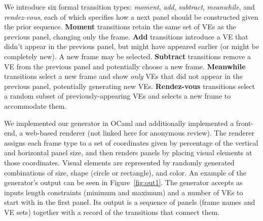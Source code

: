 
We introduce six formal transition types: {\em moment}, {\em add}, {\em
subtract}, {\em meanwhile}, and {\em rendez-vous}, each of which specifies
how a next panel should be constructed given the prior sequence.
{\bf Moment} transitions retain the same set of VEs as the previous panel, 
changing only the frame.
{\bf Add} transitions introduce a VE that didn't appear in the
previous panel, but might have appeared earlier (or might be completely
new). A new frame may be selected.
{\bf Subtract} transitions remove a VE from the previous panel and
potentially choose a new frame.
{\bf Meanwhile} transitions select a new frame and show {\em only}
VEs that did not appear in the previous panel, potentially generating new
VEs.
{\bf Rendez-vous} transitions select a random subset of
previously-appearing VEs 
and selects a new frame to accommodate them.


We implemented our generator in OCaml and additionally implemented a
front-end, a web-based renderer (not linked here for anonymous review). The
renderer assigns each frame type to a set of coordinates given by
percentage of the vertical and horizontal panel size, and then renders
panels by placing visual elements at those coordinates. Visual elements are
represented by randomly generated combinations of size, shape (circle or
rectangle), and color.  An example of the generator's output can be seen in
Figure~\ref{fig:out1}. 
The generator accepts as inputs length constraints (minimum and maximum)
and a number of VEs to start with in the first panel. Its output is a
sequence of panels (frame names and VE sets) together with a record of the
transitions that connect them.


